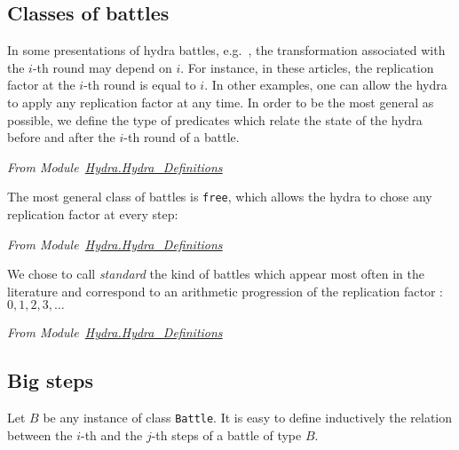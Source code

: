 \subsection{Classes of battles}
\label{sect:battle-classes}

In some presentations of hydra battles, e.g.~\cite{KP82, bauer2008}, the transformation associated with the $i$-th round may depend on $i$. For instance, in these articles, the replication factor at the $i$-th round is equal to $i$. In other examples, one can allow the hydra to apply any replication factor at any time. In order to be the most general as possible, we define the type of predicates which relate the state of the hydra before and after the $i$-th round of a battle.

\vspace{4pt}
\emph{From Module~\href{../theories/html/hydras.Hydra.Hydra_Definitions.html}{Hydra.Hydra\_Definitions}}
\label{types:Battle}




The most general class of battles is \texttt{free}, which allows the hydra to chose any replication factor at every step:

\vspace{4pt}
\emph{From Module~\href{../theories/html/hydras.Hydra.Hydra_Definitions.html\#free}{Hydra.Hydra\_Definitions}}



We chose to call \emph{standard} the kind of battles which appear  most often in the literature and correspond to an arithmetic progression of the replication factor : $0,1,2,3, \dots$

\vspace{4pt}
\emph{From Module~\href{../theories/html/hydras.Hydra.Hydra_Definitions.html\#standard}{Hydra.Hydra\_Definitions}}





\subsection{Big steps}

Let $B$ be any instance of class \texttt{Battle}. It is easy to define inductively the relation between the $i$-th and the $j$-th steps of a battle of type $B$.

